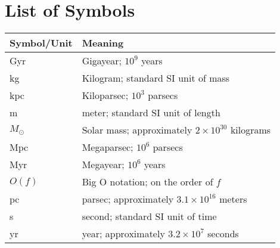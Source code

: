\chapter*{List of Symbols}
\begin{longtable}{ll} 
\hline
Symbol/Unit & Meaning\\ \hline
Gyr & Gigayear; $10^9$ years\\
kg  & Kilogram; standard SI unit of mass\\
kpc & Kiloparsec; $10^3$ parsecs\\
m   & meter; standard SI unit of length\\
$M_\odot$ & Solar mass; approximately $2 \times 10^{30}$ kilograms\\
Mpc & Megaparsec; $10^6$ parsecs\\
Myr & Megayear; $10^6$ years\\
$O(f)$ & Big O notation; on the order of $f$ \\
pc  & parsec; approximately $3.1 \times 10^{16}$ meters\\
s   & second; standard SI unit of time\\
yr  & year; approximately $3.2 \times 10^7$ seconds\\ \hline
\end{longtable}





%



%



%

%
%

